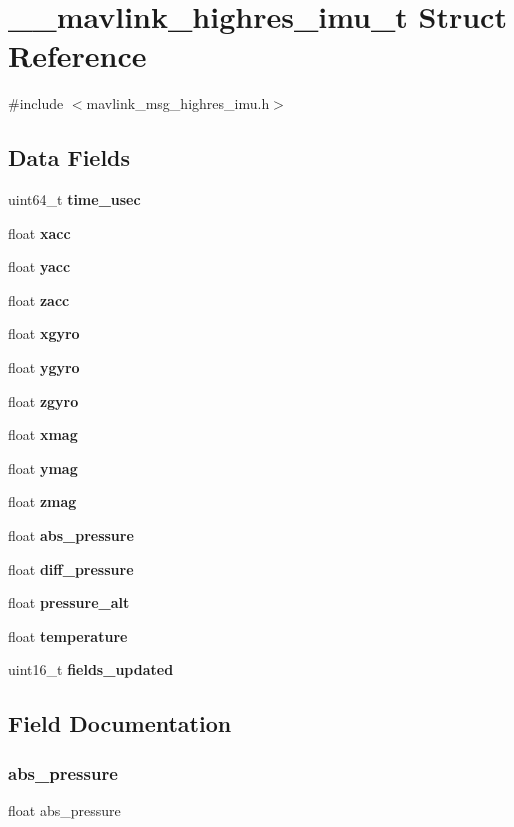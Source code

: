 \section{\+\_\+\+\_\+mavlink\+\_\+highres\+\_\+imu\+\_\+t Struct Reference}
\label{struct____mavlink__highres__imu__t}


{\ttfamily \#include $<$mavlink\+\_\+msg\+\_\+highres\+\_\+imu.\+h$>$}

\subsection*{Data Fields}
\begin{DoxyCompactItemize}
\item 
uint64\+\_\+t \textbf{ time\+\_\+usec}
\item 
float \textbf{ xacc}
\item 
float \textbf{ yacc}
\item 
float \textbf{ zacc}
\item 
float \textbf{ xgyro}
\item 
float \textbf{ ygyro}
\item 
float \textbf{ zgyro}
\item 
float \textbf{ xmag}
\item 
float \textbf{ ymag}
\item 
float \textbf{ zmag}
\item 
float \textbf{ abs\+\_\+pressure}
\item 
float \textbf{ diff\+\_\+pressure}
\item 
float \textbf{ pressure\+\_\+alt}
\item 
float \textbf{ temperature}
\item 
uint16\+\_\+t \textbf{ fields\+\_\+updated}
\end{DoxyCompactItemize}


\subsection{Field Documentation}
\mbox{\label{struct____mavlink__highres__imu__t_aef39c100f9e8e93dfd70750e443eaf8c}} 
\subsubsection{abs\+\_\+pressure}
{\footnotesize\ttfamily float abs\+\_\+pressure}

